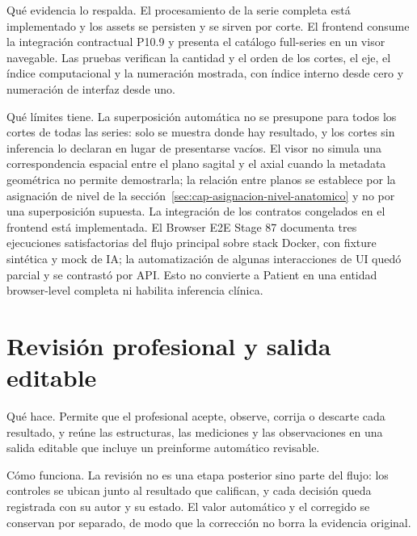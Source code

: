 \label{fig:cap11-navegacion-cortes}
Qué evidencia lo respalda. El procesamiento de la serie completa está implementado y los assets se persisten y se sirven por corte. El frontend consume la integración contractual P10.9 y presenta el catálogo full-series en un visor navegable. Las pruebas verifican la cantidad y el orden de los cortes, el eje, el índice computacional y la numeración mostrada, con índice interno desde cero y numeración de interfaz desde uno.

Qué límites tiene. La superposición automática no se presupone para todos los cortes de todas las series: solo se muestra donde hay resultado, y los cortes sin inferencia lo declaran en lugar de presentarse vacíos. El visor no simula una correspondencia espacial entre el plano sagital y el axial cuando la metadata geométrica no permite demostrarla; la relación entre planos se establece por la asignación de nivel de la sección~\ref{sec:cap-asignacion-nivel-anatomico} y no por una superposición supuesta. La integración de los contratos congelados en el frontend está implementada. El Browser E2E Stage 87 documenta tres ejecuciones satisfactorias del flujo principal sobre stack Docker, con fixture sintética y mock de IA; la automatización de algunas interacciones de UI quedó parcial y se contrastó por API. Esto no convierte a Patient en una entidad browser-level completa ni habilita inferencia clínica.
\section{Revisión profesional y salida editable}

Qué hace. Permite que el profesional acepte, observe, corrija o descarte cada resultado, y reúne las estructuras, las mediciones y las observaciones en una salida editable que incluye un preinforme automático revisable.

Cómo funciona. La revisión no es una etapa posterior sino parte del flujo: los controles se ubican junto al resultado que califican, y cada decisión queda registrada con su autor y su estado. El valor automático y el corregido se conservan por separado, de modo que la corrección no borra la evidencia original.

